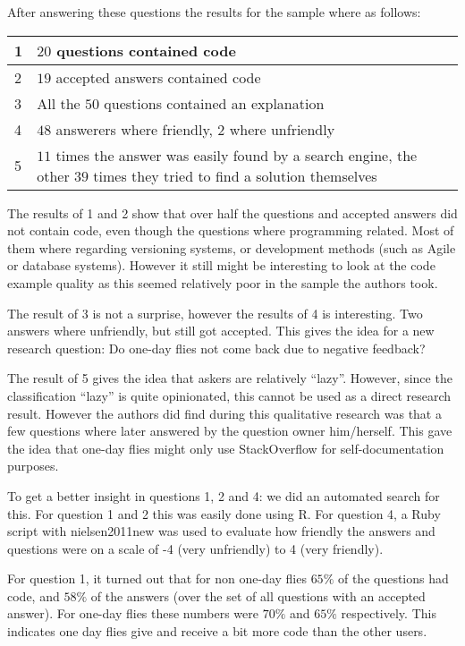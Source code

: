 \documentclass[conference]{IEEEtran}
\begin{document}
After answering these questions the results for the sample where as follows:
\newline
\newline
\begin{tabular}{ | l | p{8cm} | }
\hline
  1 & $20$ questions contained code \\
\hline
  2 & $19$ accepted answers contained code \\
\hline
  3 & All the $50$ questions contained an explanation \\
\hline
  4 & $48$ answerers where friendly, $2$ where unfriendly \\
\hline
  5 & $11$ times the answer was easily found by a search engine, the other $39$ times they tried to find a solution themselves \\
\hline
\end{tabular}
\newline
\newline

The results of 1 and 2 show that over half the questions and accepted answers
did not contain code, even though the questions where programming related. Most
of them where regarding versioning systems, or development methods (such as
Agile or database systems).  However it still might be interesting to look at
the code example quality as this seemed relatively poor in the sample the
authors took.

The result of 3 is not a surprise, however the results of 4 is interesting. Two
answers where unfriendly, but still got accepted. This gives the idea for a new
research question: Do one-day flies  not come back due to negative feedback? 

The result of 5  gives the idea that askers are relatively ``lazy''. However,
since the classification ``lazy'' is quite opinionated, this cannot be used as
a direct research result. However the authors did find during this qualitative
research was that a few questions where later answered by the question owner
him/herself. This gave the idea that one-day flies might only use StackOverflow
for self-documentation purposes. 

To get a better insight in questions 1, 2 and 4: we did an automated search for
this. For question 1 and 2 this was easily done using R. For question 4, a Ruby
script with nielsen2011new \cite{nielsen2011new} was used to evaluate how
friendly the answers and questions were on a scale of -4 (very unfriendly) to 4
(very friendly). 

For question 1, it turned out that for non one-day flies $65\%$ of the
questions had code, and $58\%$ of the answers (over the set of all questions
with an accepted answer). For one-day flies these numbers were $70\%$ and
$65\%$ respectively. This indicates one day flies give and receive a bit more
code than the other users.
\end{document}

